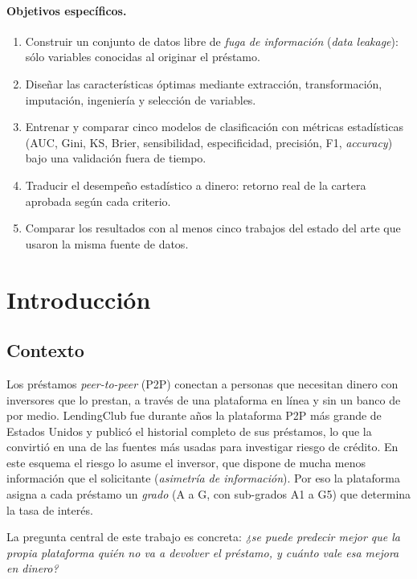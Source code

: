 \documentclass{article}
\begin{document}
\paragraph{Objetivos específicos.}
\begin{enumerate}
  \item Construir un conjunto de datos libre de \emph{fuga de información}
        (\emph{data leakage}): sólo variables conocidas al originar el préstamo.
  \item Diseñar las características óptimas mediante extracción, transformación,
        imputación, ingeniería y selección de variables.
  \item Entrenar y comparar cinco modelos de clasificación con métricas
        estadísticas (AUC, Gini, KS, Brier, sensibilidad, especificidad,
        precisión, F1, \emph{accuracy}) bajo una validación fuera de tiempo.
  \item Traducir el desempeño estadístico a dinero: retorno real de la cartera
        aprobada según cada criterio.
  \item Comparar los resultados con al menos cinco trabajos del estado del arte
        que usaron la misma fuente de datos.
\end{enumerate}

\section{Introducción}
\label{sec:intro}

\subsection{Contexto}
Los préstamos \emph{peer-to-peer} (P2P) conectan a personas que necesitan dinero
con inversores que lo prestan, a través de una plataforma en línea y sin un banco
de por medio. LendingClub fue durante años la plataforma P2P más grande de Estados
Unidos y publicó el historial completo de sus préstamos, lo que la convirtió en
una de las fuentes más usadas para investigar riesgo de crédito. En este esquema
el riesgo lo asume el inversor, que dispone de mucha menos información que el
solicitante (\emph{asimetría de información}). Por eso la plataforma asigna a
cada préstamo un \emph{grado} (A a G, con sub-grados A1 a G5) que determina la
tasa de interés.

La pregunta central de este trabajo es concreta: \emph{¿se puede predecir mejor
que la propia plataforma quién no va a devolver el préstamo, y cuánto vale esa
mejora en dinero?}
\end{document}
